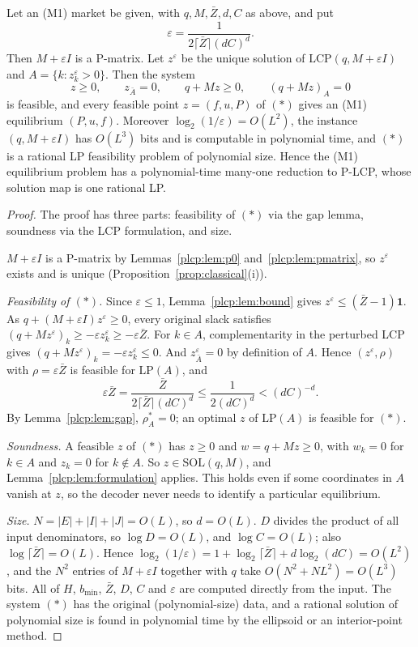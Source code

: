 \begin{theorem}[(M1) $\le_m$ P-LCP]\label{plcp:thm:main}
\statusrefereed
Let an (M1) market be given, with $q,M,\bar Z,d,C$ as above, and put
\[
  \varepsilon=\frac{1}{2\lceil\bar Z\rceil(dC)^d}.
\]
Then $M+\varepsilon I$ is a P-matrix. Let $z^\varepsilon$ be the unique solution of
$\mathrm{LCP}(q,M+\varepsilon I)$ and $A=\{k:z^\varepsilon_k>0\}$. Then the system
\[
  z\ge0,\qquad z_{\bar A}=0,\qquad q+Mz\ge0,\qquad(q+Mz)_A=0 \tag{$\ast$}
\]
is feasible, and every feasible point $z=(f,u,P)$ of $(\ast)$ gives an (M1) equilibrium $(P,u,f)$.
Moreover $\log_2(1/\varepsilon)=O(L^2)$, the instance $(q,M+\varepsilon I)$ has $O(L^3)$ bits and is
computable in polynomial time, and $(\ast)$ is a rational LP feasibility problem of polynomial size.
Hence the (M1) equilibrium problem has a polynomial-time many-one reduction to P-LCP, whose solution map
is one rational LP.
\end{theorem}

\begin{proof}
The proof has three parts: feasibility of $(\ast)$ via the gap lemma, soundness via the LCP
formulation, and size.

$M+\varepsilon I$ is a P-matrix by Lemmas~\ref{plcp:lem:p0} and~\ref{plcp:lem:pmatrix}, so
$z^\varepsilon$ exists and is unique (Proposition~\ref{prop:classical}(i)).

\emph{Feasibility of $(\ast)$.} Since $\varepsilon\le1$, Lemma~\ref{plcp:lem:bound} gives
$z^\varepsilon\le(\bar Z-1)\mathbf 1$. As $q+(M+\varepsilon I)z^\varepsilon\ge0$, every original slack
satisfies $(q+Mz^\varepsilon)_k\ge-\varepsilon z^\varepsilon_k\ge-\varepsilon\bar Z$. For $k\in A$,
complementarity in the perturbed LCP gives $(q+Mz^\varepsilon)_k=-\varepsilon z^\varepsilon_k\le0$. And
$z^\varepsilon_{\bar A}=0$ by definition of $A$. Hence $(z^\varepsilon,\rho)$ with
$\rho=\varepsilon\bar Z$ is feasible for $\mathrm{LP}(A)$, and
\[
  \varepsilon\bar Z=\frac{\bar Z}{2\lceil\bar Z\rceil(dC)^d}\le\frac{1}{2(dC)^d}<(dC)^{-d}.
\]
By Lemma~\ref{plcp:lem:gap}, $\rho^*_A=0$; an optimal $z$ of $\mathrm{LP}(A)$ is feasible for $(\ast)$.

\emph{Soundness.} A feasible $z$ of $(\ast)$ has $z\ge0$ and $w=q+Mz\ge0$, with $w_k=0$ for $k\in A$ and
$z_k=0$ for $k\notin A$. So $z\in\mathrm{SOL}(q,M)$, and Lemma~\ref{plcp:lem:formulation} applies. This
holds even if some coordinates in $A$ vanish at $z$, so the decoder never needs to identify a particular
equilibrium.

\emph{Size.} $N=|E|+|I|+|J|=O(L)$, so $d=O(L)$. $D$ divides the product of all input denominators, so
$\log D=O(L)$, and $\log C=O(L)$; also $\log\lceil\bar Z\rceil=O(L)$. Hence
$\log_2(1/\varepsilon)=1+\log_2\lceil\bar Z\rceil+d\log_2(dC)=O(L^2)$, and the $N^2$ entries of
$M+\varepsilon I$ together with $q$ take $O(N^2+NL^2)=O(L^3)$ bits. All of $H$, $b_{\min}$, $\bar Z$,
$D$, $C$ and $\varepsilon$ are computed directly from the input. The system $(\ast)$ has the original
(polynomial-size) data, and a rational solution of polynomial size is found in polynomial time by the
ellipsoid or an interior-point method.
\end{proof}

